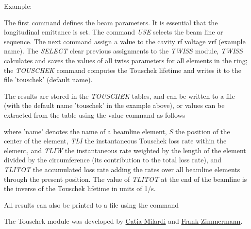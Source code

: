 Example: 

The first command defines the beam parameters. It is essential that the
longitudinal emittance is set. The command
\textit{USE} selects the beam line or sequence. The next command assign
a value to the cavity rf voltage vrf  (example name). The
\textit{SELECT} clear previous assignments to the \textit{TWISS} module,
\textit{TWISS} calculates and saves the values of all twiss parameters
for all elements in the ring; the \textit{TOUSCHEK} command computes the
Touschek lifetime and writes it to the file 'touschek' (default name).   

The results are stored in the \textit{TOUSCHEK} tables, and can be
written to a file (with the default name 'touschek' in the example
above), or values can be extracted from the table using the value
command as follows  

where 'name' denotes the name of a beamline element, \textit{S} the
position of the center of the element, \textit{TLI} the instantaneous
Touschek loss rate within the element, and \textit{TLIW} the
instantaneous rate weighted by the length of the element divided by the
circumference (its contribution to the total loss rate), and
\textit{TLITOT} the accumulated loss rate adding the rates over all
beamline elements through the present position. The value of
\textit{TLITOT} at the end of the beamline is the inverse of the
Touschek lifetime in units of 1/s. 

All results can also be printed to a file using the command 

The \madx Touschek module was developed by
\href{mailto:catia.milardi@lnf.infn.it}{Catia Milardi} and 
\href{mailto:frank.zimmermann@cern.ch}{Frank Zimmermann}.


